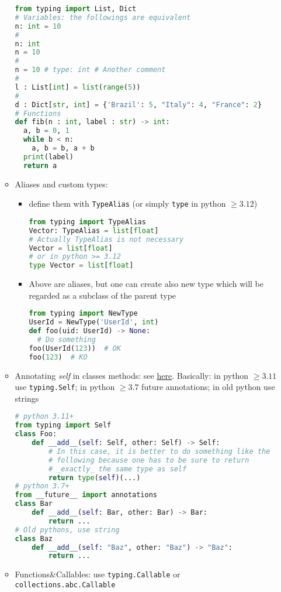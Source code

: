 \documentclass[a4paper,12pt,%
              final%
              ]{article}
\begin{document}
\begin{itemize}
\begin{itemize}
\begin{lstlisting}[language=python]
from typing import List, Dict
# Variables: the followings are equivalent
n: int = 10
#
n: int
n = 10
#
n = 10 # type: int # Another comment
#
l : List[int] = list(range(5))
#
d : Dict[str, int] = {'Brazil': 5, "Italy": 4, "France": 2}
# Functions
def fib(n : int, label : str) -> int:
  a, b = 0, 1
  while b < n:
    a, b = b, a + b
  print(label)
  return a
\end{lstlisting}
      \item Aliases and custom types:
        \begin{itemize}
          \item define them with \texttt{TypeAlias} (or simply \texttt{type} in python $\geq3.12$)
\begin{lstlisting}[language=python]
from typing import TypeAlias
Vector: TypeAlias = list[float]
# Actually TypeAlias is not necessary
Vector = list[float]
# or in python >= 3.12
type Vector = list[float]
\end{lstlisting}
          \item Above are aliases, but one can create also new type which will be regarded as a subclass of the parent type
\begin{lstlisting}[language=python]
from typing import NewType
UserId = NewType('UserId', int)
def foo(uid: UserId) -> None:
  # Do something
foo(UserId(123))  # OK
foo(123)  # KO
\end{lstlisting}
        \end{itemize}
      \item Annotating \emph{self} in classes methods: see \href{https://stackoverflow.com/a/33533514}{here}. Basically: in python $\geq3.11$ use \texttt{typing.Self}; in python $\geq3.7$ future annotations; in old python use strings
\begin{lstlisting}[language=python]
# python 3.11+
from typing import Self
class Foo:
    def __add__(self: Self, other: Self) -> Self:
        # In this case, it is better to do something like the
        # following because one has to be sure to return
        # _exactly_ the same type as self
        return type(self)(...)
# python 3.7+
from __future__ import annotations
class Bar
    def __add__(self: Bar, other: Bar) -> Bar:
        return ...
# Old pythons, use string
class Baz
    def __add__(self: "Baz", other: "Baz") -> "Baz":
        return ...
\end{lstlisting}
      \item Functions\&Callables: use \texttt{typing.Callable} or \texttt{collections.abc.Callable}
\begin{lstlisting}[language=python]

\end{lstlisting}
\end{itemize}
\end{itemize}
\end{document}
